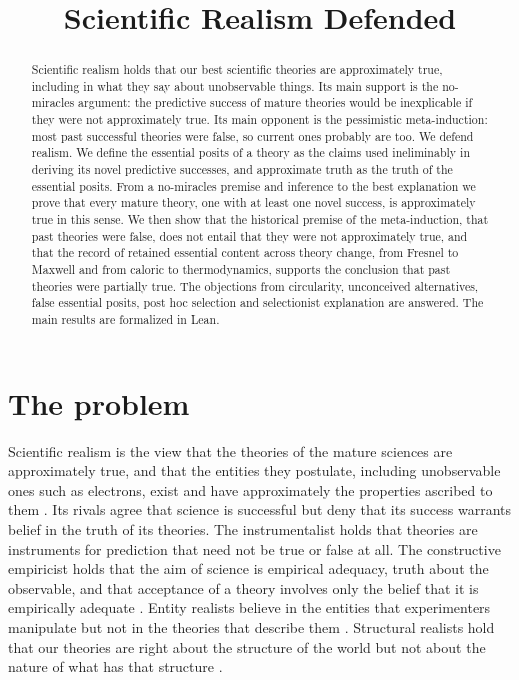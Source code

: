 \documentclass{situationist-preprint}
\title{Scientific Realism Defended}
\begin{document}
\maketitle

\begin{abstract}
Scientific realism holds that our best scientific theories are approximately true, including in what they say about unobservable things. Its main support is the no-miracles argument: the predictive success of mature theories would be inexplicable if they were not approximately true. Its main opponent is the pessimistic meta-induction: most past successful theories were false, so current ones probably are too. We defend realism. We define the essential posits of a theory as the claims used ineliminably in deriving its novel predictive successes, and approximate truth as the truth of the essential posits. From a no-miracles premise and inference to the best explanation we prove that every mature theory, one with at least one novel success, is approximately true in this sense. We then show that the historical premise of the meta-induction, that past theories were false, does not entail that they were not approximately true, and that the record of retained essential content across theory change, from Fresnel to Maxwell and from caloric to thermodynamics, supports the conclusion that past theories were partially true. The objections from circularity, unconceived alternatives, false essential posits, post hoc selection and selectionist explanation are answered. The main results are formalized in Lean.
\end{abstract}

\section{The problem}

Scientific realism is the view that the theories of the mature sciences are approximately true, and that the entities they postulate, including unobservable ones such as electrons, exist and have approximately the properties ascribed to them \citep{Smart1963,Boyd1983,Psillos1999}. Its rivals agree that science is successful but deny that its success warrants belief in the truth of its theories. The instrumentalist holds that theories are instruments for prediction that need not be true or false at all. The constructive empiricist holds that the aim of science is empirical adequacy, truth about the observable, and that acceptance of a theory involves only the belief that it is empirically adequate \citep{vanFraassen1980}. Entity realists believe in the entities that experimenters manipulate but not in the theories that describe them \citep{Hacking1983,Cartwright1983}. Structural realists hold that our theories are right about the structure of the world but not about the nature of what has that structure \citep{Worrall1989}.
\end{document}
